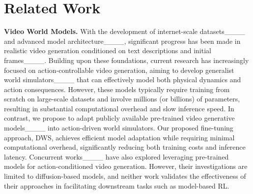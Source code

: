 \section{Related Work}
\textbf{Video World Models.} With the development of internet-scale datasets____ and advanced model architecture____, significant progress has been made in realistic video generation conditioned on text descriptions and
initial frames____. Building upon these foundations, current research has increasingly focused on action-controllable video generation, aiming to develop generalist world simulators____ that can effectively model both physical dynamics and action consequences. However, these models typically require training from scratch on large-scale datasets and involve millions (or billions) of parameters, resulting in substantial computational overhead and slow inference speed. In contrast, we propose to adapt publicly available pre-trained video generative models____ into action-driven world simulators. Our proposed fine-tuning approach, DWS, achieves efficient model adaptation while requiring minimal computational overhead, significantly reducing both training costs and inference latency. Concurrent works____ have also explored leveraging pre-trained models for action-conditioned video generation. However, their investigations are limited to diffusion-based models, and neither work validates the effectiveness of their approaches in facilitating downstream tasks such as model-based RL.

